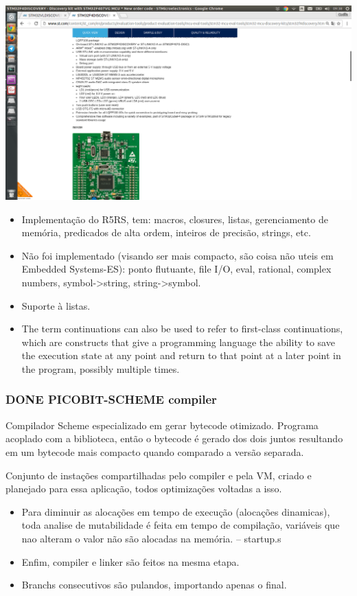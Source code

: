 \documentclass[11pt]{article}
\begin{document}
\includegraphics[width=.9\linewidth]{stm32f4.png}

\begin{itemize}
\item Implementação do R5RS, tem: macros, closures, listas, gerenciamento de memória, predicados de alta ordem, inteiros de precisão, strings, etc.
\item Não foi implementado (visando ser mais compacto, são coisa não uteis em Embedded Systems-ES): ponto flutuante, file I/O, eval, rational, complex numbers, symbol->string, string->symbol.
\item Suporte à listas.
\item The term continuations can also be used to refer to first-class continuations, which are constructs that give a programming language the ability to save the execution state at any point and return to that point at a later point in the program, possibly multiple times.
\end{itemize}

\subsubsection{{\bfseries\sffamily DONE} PICOBIT-SCHEME compiler}
\label{sec-1-2-1}

Compilador Scheme especializado em gerar bytecode otimizado. Programa acoplado com a biblioteca, então o bytecode é gerado dos dois juntos resultando em um bytecode mais compacto quando comparado a versão separada.

Conjunto de instações compartilhadas pelo compiler e pela VM, criado e planejado para essa aplicação, todos optimizações voltadas a isso.

\begin{itemize}
\item Para diminuir as alocações em tempo de execução (alocações dinamicas), toda analise de mutabilidade é feita em tempo de compilação, variáveis que nao alteram o valor não são alocadas na memória.   --   startup.s
\item Enfim, compiler e linker são feitos na mesma etapa.
\item Branchs consecutivos são pulandos, importando apenas o final.
\end{itemize}
\end{document}
